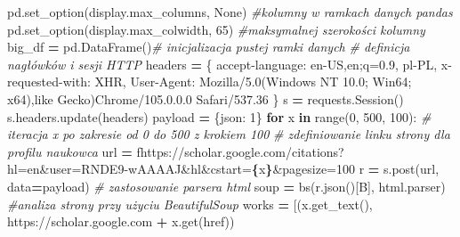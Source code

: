 \documentclass[
  12pt,
]{article}
\newenvironment{Shaded}{\begin{snugshade}}{\end{snugshade}}
\newcommand{\BuiltInTok}[1]{#1}
\newcommand{\CommentTok}[1]{\textcolor[rgb]{0.56,0.35,0.01}{\textit{#1}}}
\newcommand{\ControlFlowTok}[1]{\textcolor[rgb]{0.13,0.29,0.53}{\textbf{#1}}}
\newcommand{\DecValTok}[1]{\textcolor[rgb]{0.00,0.00,0.81}{#1}}
\newcommand{\KeywordTok}[1]{\textcolor[rgb]{0.13,0.29,0.53}{\textbf{#1}}}
\newcommand{\NormalTok}[1]{#1}
\newcommand{\OperatorTok}[1]{\textcolor[rgb]{0.81,0.36,0.00}{\textbf{#1}}}
\newcommand{\SpecialCharTok}[1]{\textcolor[rgb]{0.81,0.36,0.00}{\textbf{#1}}}
\newcommand{\SpecialStringTok}[1]{\textcolor[rgb]{0.31,0.60,0.02}{#1}}
\newcommand{\StringTok}[1]{\textcolor[rgb]{0.31,0.60,0.02}{#1}}
\newcommand{\VariableTok}[1]{\textcolor[rgb]{0.00,0.00,0.00}{#1}}
\begin{document}
\begin{Shaded}
\begin{Highlighting}[]
\NormalTok{pd.set\_option(}\StringTok{\textquotesingle{}display.max\_columns\textquotesingle{}}\NormalTok{, }\VariableTok{None}\NormalTok{) }\CommentTok{\#kolumny w ramkach danych pandas}
\NormalTok{pd.set\_option(}\StringTok{\textquotesingle{}display.max\_colwidth\textquotesingle{}}\NormalTok{, }\DecValTok{65}\NormalTok{) }\CommentTok{\#maksymalnej szerokości kolumny}
\NormalTok{big\_df }\OperatorTok{=}\NormalTok{ pd.DataFrame()}\CommentTok{\# inicjalizacja pustej ramki danych}
\CommentTok{\# definicja nagłówków i sesji HTTP}
\NormalTok{headers }\OperatorTok{=}\NormalTok{ \{}
    \StringTok{\textquotesingle{}accept{-}language\textquotesingle{}}\NormalTok{: }\StringTok{\textquotesingle{}en{-}US,en;q=0.9, pl{-}PL\textquotesingle{}}\NormalTok{,}
    \StringTok{\textquotesingle{}x{-}requested{-}with\textquotesingle{}}\NormalTok{: }\StringTok{\textquotesingle{}XHR\textquotesingle{}}\NormalTok{,}
    \StringTok{\textquotesingle{}User{-}Agent\textquotesingle{}}\NormalTok{:}
    \StringTok{\textquotesingle{}Mozilla/5.0(Windows NT 10.0; Win64; x64),like Gecko)Chrome/105.0.0.0 Safari/537.36\textquotesingle{}}
\NormalTok{\}}
\NormalTok{s }\OperatorTok{=}\NormalTok{ requests.Session()}
\NormalTok{s.headers.update(headers)}
\NormalTok{payload }\OperatorTok{=}\NormalTok{ \{}\StringTok{\textquotesingle{}json\textquotesingle{}}\NormalTok{: }\StringTok{\textquotesingle{}1\textquotesingle{}}\NormalTok{\}}
\ControlFlowTok{for}\NormalTok{ x }\KeywordTok{in} \BuiltInTok{range}\NormalTok{(}\DecValTok{0}\NormalTok{, }\DecValTok{500}\NormalTok{, }\DecValTok{100}\NormalTok{): }\CommentTok{\# iteracja x po zakresie od 0 do 500 z krokiem 100}
    \CommentTok{\# zdefiniowanie linku strony dla profilu naukowca}
\NormalTok{    url }\OperatorTok{=} \SpecialStringTok{f\textquotesingle{}https://scholar.google.com/citations?hl=en\&user=RNDE9{-}wAAAAJ\&hl\&cstart=}\SpecialCharTok{\{}\NormalTok{x}\SpecialCharTok{\}}\SpecialStringTok{\&pagesize=100\textquotesingle{}}
\NormalTok{    r }\OperatorTok{=}\NormalTok{ s.post(url, data}\OperatorTok{=}\NormalTok{payload)}
    \CommentTok{\# zastosowanie parsera html}
\NormalTok{    soup }\OperatorTok{=}\NormalTok{ bs(r.json()[}\StringTok{\textquotesingle{}B\textquotesingle{}}\NormalTok{], }\StringTok{\textquotesingle{}html.parser\textquotesingle{}}\NormalTok{) }\CommentTok{\#analiza strony przy użyciu BeautifulSoup}
\NormalTok{    works }\OperatorTok{=}\NormalTok{ [(x.get\_text(), }\StringTok{\textquotesingle{}https://scholar.google.com\textquotesingle{}} \OperatorTok{+}\NormalTok{ x.get(}\StringTok{\textquotesingle{}href\textquotesingle{}}\NormalTok{))}

\end{Highlighting}
\end{Shaded}
\end{document}
